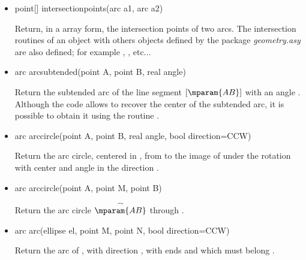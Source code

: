 \documentclass[pdftex]{article}
\newcommand{\geo}{the package \emph{geometry.asy}\xspace}
\begin{document}
\begin{itemize}
\item {}
  \begin{Vcolor}
    point[] intersectionpoints(arc a1, arc a2)
  \end{Vcolor}
  Return, in a array form, the intersection points of two arcs.
  The intersection routines of an object  with
  others objects defined by \geo are also defined; for example
  ,
  ,
   etc...
\item {}
  \begin{Vcolor}
    arc arcsubtended(point A, point B, real angle)
  \end{Vcolor}
  Return the subtended arc of the line segment $[\mparam{AB}]$ with an
  angle . Although the code 
  allows to recover the center of the subtended arc, it is possible
  to obtain it using the routine\linebreak
  .
\item {}
  \begin{Vcolor}
    arc arccircle(point A, point B, real angle, bool direction=CCW)
  \end{Vcolor}
  Return the arc circle, centered in , from  to the
  image of  under the rotation with center  and
  angle  in the direction .
\item {}
  \begin{Vcolor}
    arc arccircle(point A, point M, point B)
  \end{Vcolor}
  Return the arc circle $\stackrel{\frown}{\mparam{AB}}$ through .
\item {}
  \begin{Vcolor}
    arc arc(ellipse el, point M, point N, bool direction=CCW)
  \end{Vcolor}
  Return the arc of , with direction ,
  with ends  and  which must belong .\\

\end{itemize}
\end{document}
